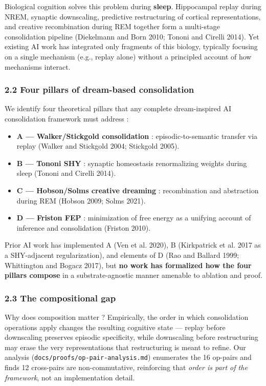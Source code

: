 \documentclass[
]{article}
\providecommand{\tightlist}{%
  \setlength{\itemsep}{0pt}\setlength{\parskip}{0pt}}
\begin{document}
Biological cognition solves this problem during \textbf{sleep}.
Hippocampal replay during NREM, synaptic downscaling, predictive
restructuring of cortical representations, and creative recombination
during REM together form a multi-stage consolidation pipeline
(Diekelmann and Born 2010; Tononi and Cirelli 2014). Yet existing AI
work has integrated only fragments of this biology, typically focusing
on a single mechanism (e.g., replay alone) without a principled account
of how mechanisms interact.

\subsubsection{2.2 Four pillars of dream-based
consolidation}\label{four-pillars-of-dream-based-consolidation}

We identify four theoretical pillars that any complete dream-inspired AI
consolidation framework must address :

\begin{itemize}
\tightlist
\item
  \textbf{A --- Walker/Stickgold consolidation} : episodic-to-semantic
  transfer via replay (Walker and Stickgold 2004; Stickgold 2005).
\item
  \textbf{B --- Tononi SHY} : synaptic homeostasis renormalizing weights
  during sleep (Tononi and Cirelli 2014).
\item
  \textbf{C --- Hobson/Solms creative dreaming} : recombination and
  abstraction during REM (Hobson 2009; Solms 2021).
\item
  \textbf{D --- Friston FEP} : minimization of free energy as a unifying
  account of inference and consolidation (Friston 2010).
\end{itemize}

Prior AI work has implemented A (Ven et al. 2020), B ({Kirkpatrick et
al.} 2017 as a SHY-adjacent regularization), and elements of D (Rao and
Ballard 1999; Whittington and Bogacz 2017), but \textbf{no work has
formalized how the four pillars compose} in a substrate-agnostic manner
amenable to ablation and proof.

\subsubsection{2.3 The compositional gap}\label{the-compositional-gap}

Why does composition matter ? Empirically, the order in which
consolidation operations apply changes the resulting cognitive state ---
replay before downscaling preserves episodic specificity, while
downscaling before restructuring may erase the very representations that
restructuring is meant to refine. Our analysis
(\texttt{docs/proofs/op-pair-analysis.md}) enumerates the 16 op-pairs
and finds 12 cross-pairs are non-commutative, reinforcing that
\emph{order is part of the framework}, not an implementation detail.
\end{document}

